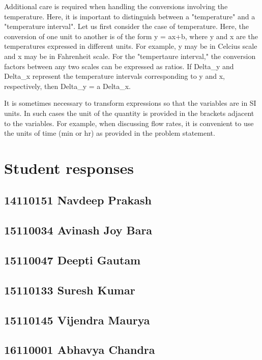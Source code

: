 \documentclass[journal=jpcbfk,manuscript=article]{achemso}
\begin{document}
Additional care is required when handling the conversions involving the temperature. Here, it is important to distinguish between a "temperature" and a "temperature interval". Let us first consider the case of temperature. Here, the conversion of one unit to another is of the form y = ax+b, where y and x are the temperatures expressed in different units. For example, y may be in Celcius scale and x may be in Fahrenheit scale. For the "tempertaure interval," the conversion factors between any two scales can be expressed as ratios. If Delta_y and Delta_x represent the temperature intervals corresponding to y and x, respectively, then Delta_y = a Delta_x.

It is sometimes necessary to transform expressions so that the variables are in SI units. In such cases the unit of the quantity is provided in the brackets adjacent to the variables. For example, when discussing flow rates, it is convenient to use the units of time (min or hr) as provided in the problem statement.


\section{Student responses}

\subsection {14110151	Navdeep Prakash}

\subsection {15110034	Avinash Joy Bara}

\subsection {15110047	Deepti Gautam}

\subsection {15110133	Suresh Kumar}

\subsection {15110145	Vijendra Maurya}

\subsection {16110001	Abhavya Chandra}
\end{document}
